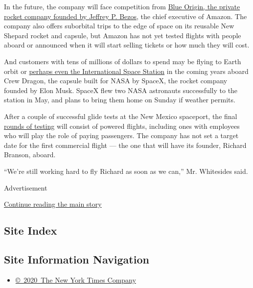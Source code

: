 In the future, the company will face competition from
\href{https://www.nytimes.com/2020/04/30/science/nasa-moon-lander.html}{Blue
Origin, the private rocket company founded by Jeffrey P. Bezos}, the
chief executive of Amazon. The company also offers suborbital trips to
the edge of space on its reusable New Shepard rocket and capsule, but
Amazon has not yet tested flights with people aboard or announced when
it will start selling tickets or how much they will cost.

And customers with tens of millions of dollars to spend may be flying to
Earth orbit or
\href{https://www.nytimes.com/2020/03/05/science/axiom-space-station.html}{perhaps
even the International Space Station} in the coming years aboard Crew
Dragon, the capsule built for NASA by SpaceX, the rocket company founded
by Elon Musk. SpaceX flew two NASA astronauts successfully to the
station in May, and plans to bring them home on Sunday if weather
permits.

After a couple of successful glide tests at the New Mexico spaceport,
the final
\href{https://www.nytimes.com/2018/12/13/science/virgin-galactic-spaceship.html}{rounds
of testing} will consist of powered flights, including ones with
employees who will play the role of paying passengers. The company has
not set a target date for the first commercial flight --- the one that
will have its founder, Richard Branson, aboard.

``We're still working hard to fly Richard as soon as we can,'' Mr.
Whitesides said.

Advertisement

\protect\hyperlink{after-bottom}{Continue reading the main story}

\hypertarget{site-index}{%
\subsection{Site Index}\label{site-index}}

\hypertarget{site-information-navigation}{%
\subsection{Site Information
Navigation}\label{site-information-navigation}}

\begin{itemize}
\tightlist
\item
  \href{https://help.nytimes.com/hc/en-us/articles/115014792127-Copyright-notice}{©~2020~The
  New York Times Company}
\end{itemize}


